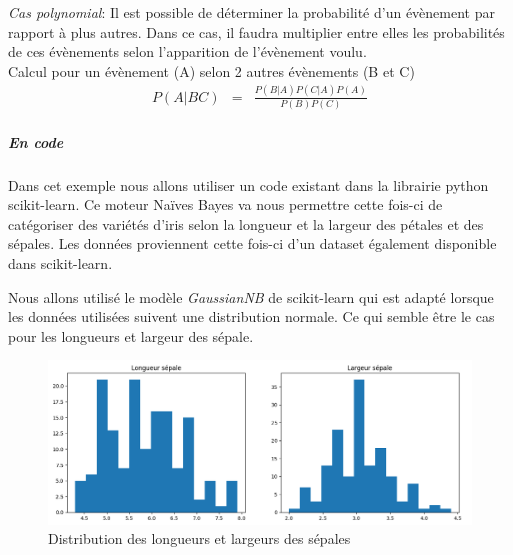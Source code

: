 \documentclass[a4paper,12pt]{article}
\begin{document}
				\emph{Cas polynomial}: Il est possible de déterminer la probabilité d'un évènement par rapport à plus autres. Dans ce cas, il faudra multiplier entre elles les probabilités de ces évènements selon l'apparition de l'évènement voulu.\\
				
				 Calcul pour un évènement (A) selon 2 autres évènements (B et C)
				 \begin{eqnarray*}
				 	P(A|BC) &=& \frac{P(B|A)P(C|A)P(A)}{P(B)P(C)}
				 \end{eqnarray*}
				
				\subparagraph{En code} Dans cet exemple nous allons utiliser un code existant dans la librairie python scikit-learn\cite{scikit-learn}. Ce moteur Naïves Bayes va nous permettre cette fois-ci de catégoriser des variétés d'iris selon la longueur et la largeur des pétales et des sépales. Les données proviennent cette fois-ci d'un dataset également disponible dans scikit-learn.
				
				Nous allons utilisé le modèle \emph{GaussianNB} de scikit-learn qui est adapté lorsque les données utilisées suivent une distribution normale. Ce qui semble être le cas pour les longueurs et largeur des sépale. 
				\begin{figure}[H]
					\includegraphics[width=\linewidth]{img/NBdistrib.png}
					\caption{Distribution des longueurs et largeurs des sépales}
				\end{figure}
				
\end{document}
